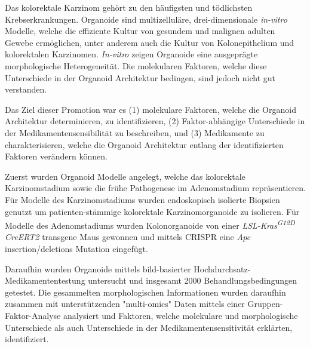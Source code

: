 Das kolorektale Karzinom gehört zu den häufigsten und tödlichsten Krebserkrankungen. Organoide sind multizelluläre, drei-dimensionale \textit{in-vitro} Modelle, welche die effiziente Kultur von gesundem und malignen adulten Gewebe ermöglichen, unter anderem auch die Kultur von Kolonepithelium und kolorektalen Karzinomen. \textit{In-vitro} zeigen Organoide eine ausgeprägte morphologische Heterogeneität. Die molekularen Faktoren, welche diese Unterschiede in der Organoid Architektur bedingen, sind jedoch nicht gut verstanden.
\bigbreak

Das Ziel dieser Promotion war es (1) molekulare Faktoren, welche die Organoid Architektur determinieren, zu identifizieren, (2) Faktor-abhängige Unterschiede in der Medikamentensensibilität zu beschreiben, und (3) Medikamente zu charakterisieren, welche die Organoid Architektur entlang der identifizierten Faktoren verändern können. 
\bigbreak

Zuerst wurden Organoid Modelle angelegt, welche das kolorektale Karzinomstadium sowie die frühe Pathogenese im Adenomstadium repräsentieren. Für Modelle des Karzinomstadiums wurden endoskopisch isolierte Biopsien genutzt um patienten-stämmige kolorektale Karzinomorganoide zu isolieren. Für Modelle des Adenomstadiums wurden Kolonorganoide von einer \textit{LSL-Kras\textsuperscript{G12D} CreERT2} transgene Maus gewonnen und mittels CRISPR eine  \textit{Apc} insertion/deletions Mutation eingefügt.
\bigbreak

Daraufhin wurden Organoide mittels bild-basierter Hochdurchsatz-Medikamententestung untersucht und insgesamt 2000 Behandlungsbedingungen getestet. Die gesammelten morphologischen Informationen wurden daraufhin zusammen mit unterstützenden "multi-omics" Daten mittels einer Gruppen-Faktor-Analyse analysiert und Faktoren, welche molekulare und morphologische Unterschiede als auch Unterschiede in der Medikamentensensitivität erklärten, identifiziert.
\bigbreak

